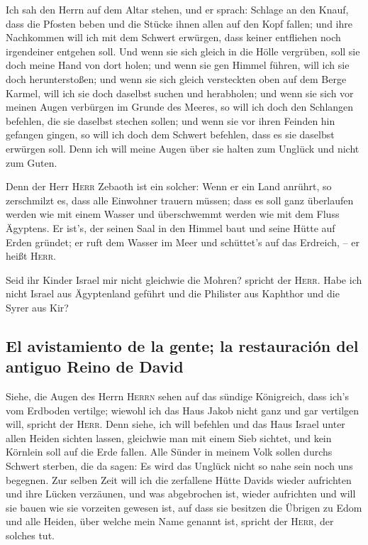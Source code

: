  Ich sah den Herrn auf dem Altar stehen, und er sprach:
Schlage an den Knauf, dass die Pfosten beben und die Stücke ihnen allen
auf den Kopf fallen; und ihre Nachkommen will ich mit dem Schwert
erwürgen, dass keiner entfliehen noch irgendeiner entgehen soll.
 Und wenn sie sich gleich in die Hölle vergrüben, soll sie
doch meine Hand von dort holen; und wenn sie gen Himmel führen, will ich
sie doch herunterstoßen;  und wenn sie sich gleich
versteckten oben auf dem Berge Karmel, will ich sie doch daselbst suchen
und herabholen; und wenn sie sich vor meinen Augen verbürgen im Grunde
des Meeres, so will ich doch den Schlangen befehlen, die sie daselbst
stechen sollen;  und wenn sie vor ihren Feinden hin
gefangen gingen, so will ich doch dem Schwert befehlen, dass es sie
daselbst erwürgen soll. Denn ich will meine Augen über sie halten zum
Unglück und nicht zum Guten.

 Denn der Herr \textsc{Herr} Zebaoth ist ein solcher: Wenn
er ein Land anrührt, so zerschmilzt es, dass alle Einwohner trauern
müssen; dass es soll ganz überlaufen werden wie mit einem Wasser und
überschwemmt werden wie mit dem Fluss Ägyptens.  Er ist's,
der seinen Saal in den Himmel baut und seine Hütte auf Erden gründet; er
ruft dem Wasser im Meer und schüttet's auf das Erdreich, -- er heißt
\textsc{Herr}.

 Seid ihr Kinder Israel mir nicht gleichwie die Mohren?
spricht der \textsc{Herr}. Habe ich nicht Israel aus Ägyptenland geführt
und die Philister aus Kaphthor und die Syrer aus Kir?

\hypertarget{el-avistamiento-de-la-gente-la-restauraciuxf3n-del-antiguo-reino-de-david}{%
\subsection{El avistamiento de la gente; la restauración del antiguo
Reino de
David}\label{el-avistamiento-de-la-gente-la-restauraciuxf3n-del-antiguo-reino-de-david}}

 Siehe, die Augen des Herrn \textsc{Herrn} sehen auf das
sündige Königreich, dass ich's vom Erdboden vertilge; wiewohl ich das
Haus Jakob nicht ganz und gar vertilgen will, spricht der \textsc{Herr}.
 Denn siehe, ich will befehlen und das Haus Israel unter
allen Heiden sichten lassen, gleichwie man mit einem Sieb sichtet, und
kein Körnlein soll auf die Erde fallen.  Alle Sünder in
meinem Volk sollen durchs Schwert sterben, die da sagen: Es wird das
Unglück nicht so nahe sein noch uns begegnen.  Zur selben
Zeit will ich die zerfallene Hütte Davids wieder aufrichten und ihre
Lücken verzäunen, und was abgebrochen ist, wieder aufrichten und will
sie bauen wie sie vorzeiten gewesen ist,  auf dass sie
besitzen die Übrigen zu Edom und alle Heiden, über welche mein Name
genannt ist, spricht der \textsc{Herr}, der solches tut.

